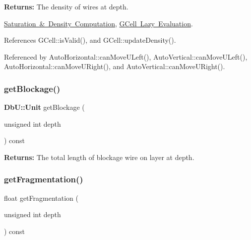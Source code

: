 {\bfseries Returns\+:} The density of wires at {\ttfamily depth}.

\mbox{\hyperlink{classKatabatic_1_1GCell_secGCellDensity}{Saturation \& Density Computation}}, \mbox{\hyperlink{classKatabatic_1_1GCell_secGCellLazyEvaluation}{G\+Cell Lazy Evaluation}}. 

References G\+Cell\+::is\+Valid(), and G\+Cell\+::update\+Density().



Referenced by Auto\+Horizontal\+::can\+Move\+U\+Left(), Auto\+Vertical\+::can\+Move\+U\+Left(), Auto\+Horizontal\+::can\+Move\+U\+Right(), and Auto\+Vertical\+::can\+Move\+U\+Right().

\mbox{\label{classKatabatic_1_1GCell_ab37ffda5a2e1ba60931d32c29237bd33}} 
\subsubsection{\texorpdfstring{get\+Blockage()}{getBlockage()}}
{\footnotesize\ttfamily \textbf{ Db\+U\+::\+Unit} get\+Blockage (\begin{DoxyParamCaption}\item[{unsigned int}]{depth }\end{DoxyParamCaption}) const\hspace{0.3cm}{\ttfamily [inline]}}

{\bfseries Returns\+:} The total length of blockage wire on layer at {\ttfamily depth}. \mbox{\label{classKatabatic_1_1GCell_a44ec8d16030b5900bd0ccc02652b727f}} 
\subsubsection{\texorpdfstring{get\+Fragmentation()}{getFragmentation()}}
{\footnotesize\ttfamily float get\+Fragmentation (\begin{DoxyParamCaption}\item[{unsigned int}]{depth }\end{DoxyParamCaption}) const\hspace{0.3cm}{\ttfamily [inline]}}

